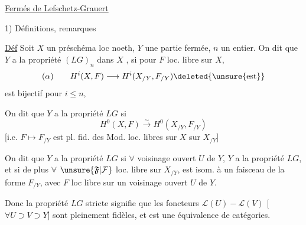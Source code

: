 
\uline{Fermés de Lefschetz-Grauert}

1) Définitions, remarques

\uline{Déf} Soit $X$ un préschéma loc noeth, $Y$ une partie
fermée, $n$ un entier. On dit que $Y$ a la propriété
$(LG)_n$ dans $X$ ,
si pour  $F$ loc. libre sur $X$,
\[
(\alpha)\qquad H^i(X,F)\longrightarrow H^i(X_{/Y},F_{/Y})
\deleted{\unsure{\text{est}}}
\]
est bijectif pour $i\leq n$, 


On dit que $Y$ a la propriété $LG$  si
\[
H^0(X,F)\xrightarrow{\sim}H^0(X_{/Y},F_{/Y})
\]
[i.e. $F\longmapsto F_{/Y}$ est pl. fid. des Mod. loc. libres
sur $X$  sur $X_{/Y}$]

On dit que $Y$ a la propriété $LG$  si
$\forall$ voisinage ouvert $U$ de $Y$, 
 $Y$ a la propriété $LG$,
et si de plus 
$\forall$ $\unsure{\mathfrak F|\mathcal F}$ loc. libre sur $X_{/Y}$,
 est isom. à un faisceau de la forme
$F_{/Y}$, avec $F$ loc libre sur un voisinage ouvert $U$ de $Y$.



Donc la propriété $LG$ stricte signifie que les foncteurs
$\mathcal L(U)\mathbin{-}\mathcal L(V)$
[$\forall U\supset V\supset Y$] sont pleinement fidèles, et
est une équivalence de catégories.


